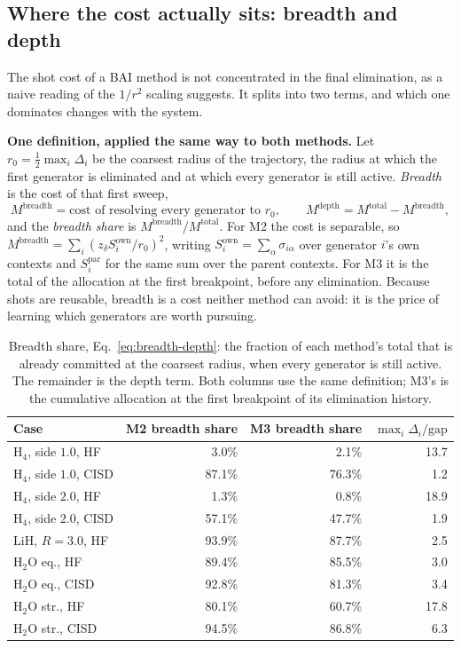 \documentclass[10pt]{article}
\begin{document}
\subsection{Where the cost actually sits: breadth and depth}
\label{sec:breadth-depth}

The shot cost of a BAI method is not concentrated in the final elimination, as a
naive reading of the $1/r^2$ scaling suggests. It splits into two terms, and
which one dominates changes with the system.

\textbf{One definition, applied the same way to both methods.} Let
$r_0=\tfrac12\max_i\Delta_i$ be the coarsest radius of the trajectory, the radius
at which the first generator is eliminated and at which every generator is still
active. \emph{Breadth} is the cost of that first sweep,
\begin{equation}
  M^{\text{breadth}} = \text{cost of resolving every generator to } r_0 ,
  \qquad
  M^{\text{depth}} = M^{\text{total}} - M^{\text{breadth}} ,
  \label{eq:breadth-depth}
\end{equation}
and the \emph{breadth share} is $M^{\text{breadth}}/M^{\text{total}}$. For M2 the
cost is separable, so $M^{\text{breadth}}=\sum_i (z_\delta S_i^{\text{own}}/r_0)^2$,
writing $S_i^{\text{own}}=\sum_{\alpha}\sigma_{i\alpha}$ over generator $i$'s own
contexts and $S_i^{\text{par}}$ for the same sum over the parent contexts. For M3 it is
the total of the allocation at the first breakpoint, before any elimination.
Because shots are reusable, breadth is a cost neither method can avoid: it is the
price of learning which generators are worth pursuing.

\begin{table}[!htbp]
\centering
\scriptsize
\caption{Breadth share, Eq.~\eqref{eq:breadth-depth}: the fraction of each method's total that is already committed at the coarsest radius, when every generator is still active. The remainder is the depth term. Both columns use the same definition; M3's is the cumulative allocation at the first breakpoint of its elimination history.}
\label{tab:breadth-depth}
\begin{tabular}{lrrr}
\toprule
Case & M2 breadth share & M3 breadth share & $\max_i\Delta_i/\mathrm{gap}$ \\
\midrule
H$_4$, side $1.0$, HF   & 3.0\%  & 2.1\%  & 13.7 \\
H$_4$, side $1.0$, CISD & 87.1\% & 76.3\% & 1.2 \\
H$_4$, side $2.0$, HF   & 1.3\%  & 0.8\%  & 18.9 \\
H$_4$, side $2.0$, CISD & 57.1\% & 47.7\% & 1.9 \\
LiH, $R{=}3.0$, HF      & 93.9\% & 87.7\% & 2.5 \\
H$_2$O eq., HF          & 89.4\% & 85.5\% & 3.0 \\
H$_2$O eq., CISD        & 92.8\% & 81.3\% & 3.4 \\
H$_2$O str., HF         & 80.1\% & 60.7\% & 17.8 \\
H$_2$O str., CISD       & 94.5\% & 86.8\% & 6.3 \\
\bottomrule
\end{tabular}
\end{table}
\end{document}
